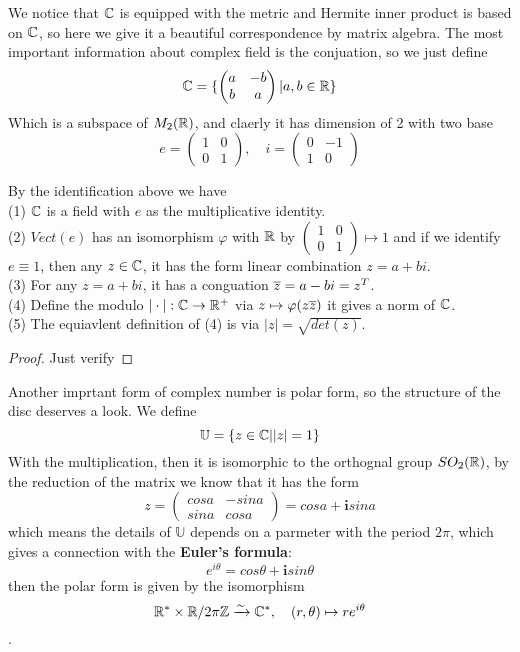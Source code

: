 \documentclass[en,geye,blue,pc,12pt]{elegantnote}
\begin{document}
We notice that \(\mathbb{C}\) is equipped with the metric and Hermite inner product is based on \(\mathbb{C}\), so here we give it a beautiful correspondence by matrix algebra. The most important information about complex field is the conjuation, so we just define 
\[\mathbb{C} = \{\begin{pmatrix}
a &-b \\
b &a
\end{pmatrix}| a,b\in \mathbb{R}\}\]
Which is a subspace of \(M_2(\mathbb{R})\), and claerly it has dimension of 2 with two base
\[e = \begin{pmatrix}
  1 &0 \\
  0 &1 
\end{pmatrix}, \quad i = \begin{pmatrix}
  0 &-1\\
  1 &0
\end{pmatrix}\]

\begin{proposition} By the identification above we have
  \\(1) \(\mathbb{C}\) is a field with \(e\) as the multiplicative identity.
  \\(2) \(Vect(e)\) has an isomorphism \(\varphi\) with \(\mathbb{R}\) by \(\begin{pmatrix}
    1 &0 \\
    0 &1
  \end{pmatrix}\mapsto 1\) and if we identify \(e \equiv 1 \), then any \(z \in \mathbb{C}\), it has the form linear combination \(z = a+bi\).
  \\(3) For any \(z=a+bi\), it has a conguation \(\overline{z} = a -bi = z^T\).
  \\(4) Define the modulo \(|\cdot|:\mathbb{C} \to \mathbb{R}^+\) via \(z \mapsto \varphi(z \overline{z}) \) it gives a norm of \(\mathbb{C}\).
  \\(5) The equiavlent definition of (4) is via \(|z| = \sqrt{det(z)}\).
  \begin{proof}
    Just verify
  \end{proof}
\end{proposition}

Another imprtant form of complex number is polar form, so the structure of the disc deserves a look. We define
\[\mathbb{U} = \{z\in \mathbb{C} | |z| = 1 \}\]
With the multiplication, then it is isomorphic to the orthognal group \(SO_2(\mathbb{R})\), by the reduction of the matrix we know that it has the form
\[z = \begin{pmatrix}
  cosa & -sina \\
  sina & cosa 
\end{pmatrix}= cosa + \mathbf{i}sina\]
which means the details of \(\mathbb{U}\) depends on a parmeter with the period \(2 \pi\), which gives a connection with the \textbf{Euler's formula}:
\[e^{i \theta} = cos\theta + \mathbf{i} sin\theta\]
then the polar form is given by the isomorphism
\[\mathbb{R}^* \times \mathbb{R}/ 2\pi \mathbb{Z}  \xrightarrow{\sim} \mathbb{C}^*, \quad (r,\theta) \mapsto re^{i\theta}
\].
\end{document}
